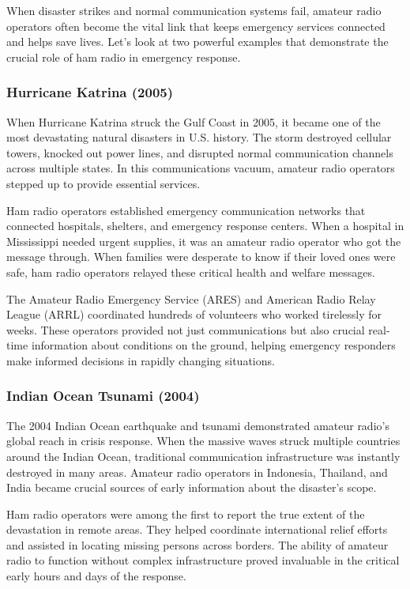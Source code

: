 When disaster strikes and normal communication systems fail, amateur radio operators often become the vital link that keeps emergency services connected and helps save lives. Let's look at two powerful examples that demonstrate the crucial role of ham radio in emergency response.

\subsubsection*{Hurricane Katrina (2005)}
When Hurricane Katrina struck the Gulf Coast in 2005, it became one of the most devastating natural disasters in U.S. history. The storm destroyed cellular towers, knocked out power lines, and disrupted normal communication channels across multiple states. In this communications vacuum, amateur radio operators stepped up to provide essential services.

Ham radio operators established emergency communication networks that connected hospitals, shelters, and emergency response centers. When a hospital in Mississippi needed urgent supplies, it was an amateur radio operator who got the message through. When families were desperate to know if their loved ones were safe, ham radio operators relayed these critical health and welfare messages.

The Amateur Radio Emergency Service (ARES) and American Radio Relay League (ARRL) coordinated hundreds of volunteers who worked tirelessly for weeks. These operators provided not just communications but also crucial real-time information about conditions on the ground, helping emergency responders make informed decisions in rapidly changing situations.

\subsubsection*{Indian Ocean Tsunami (2004)}
The 2004 Indian Ocean earthquake and tsunami demonstrated amateur radio's global reach in crisis response. When the massive waves struck multiple countries around the Indian Ocean, traditional communication infrastructure was instantly destroyed in many areas. Amateur radio operators in Indonesia, Thailand, and India became crucial sources of early information about the disaster's scope.

Ham radio operators were among the first to report the true extent of the devastation in remote areas. They helped coordinate international relief efforts and assisted in locating missing persons across borders. The ability of amateur radio to function without complex infrastructure proved invaluable in the critical early hours and days of the response.

